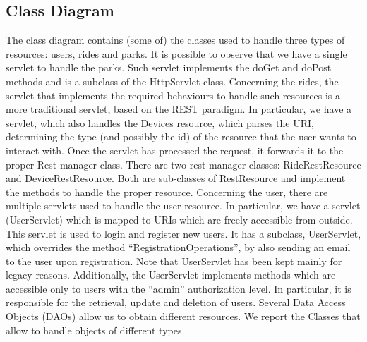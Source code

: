 \subsection{Class Diagram}

The class diagram contains (some of) the classes used to handle three types of resources: users, rides and parks. It is possible to observe that we have a single servlet to handle the parks. Such servlet implements the doGet and doPost methods and is a subclass of the HttpServlet class. Concerning the rides, the servlet that implements the required behaviours to handle such resources is a more traditional servlet, based on the REST paradigm. In particular, we have a servlet, which also handles the Devices resource, which parses the URI, determining the type (and possibly the id) of the resource that the user wants to interact with. Once the servlet has processed the request, it forwards it to the proper Rest manager class. There are two rest manager classes: RideRestResource and DeviceRestResource. Both are sub-classes of RestResource and implement the methods to handle the proper resource. Concerning the user, there are multiple servlets used to handle the user resource. In particular, we have a servlet (UserServlet) which is mapped to URIs which are freely accessible from outside. This servlet is used to login and register new users. It has a subclass, UserServlet, which overrides the method “RegistrationOperations”, by also sending an email to the user upon registration. Note that UserServlet has been kept mainly for legacy reasons. Additionally, the UserServlet implements methods which are accessible only to users with the “admin” authorization level. In particular, it is responsible for the retrieval, update and deletion of users. Several Data Access Objects (DAOs) allow us to obtain different resources. We report the Classes that allow to handle objects of different types.